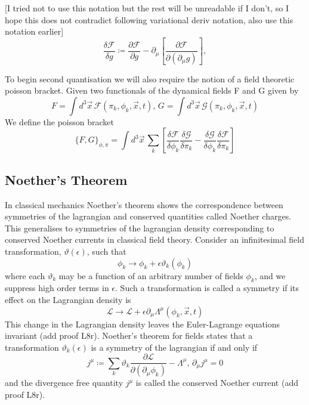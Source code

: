 \documentclass[11pt, a4paper]{article}
\theoremstyle{definition}
\theoremstyle{plain}
\begin{document}
[I tried not to use this notation but the rest will be unreadable if I don't, so I hope this
does not contradict following variational deriv notation, also use this notation earlier]
\begin{equation}
  \frac{\delta \mathcal{F}}{\delta g} \coloneq \frac{\partial \mathcal{F}}{\partial g}
  - \partial_\mu \left[ \frac{\partial \mathcal{F}}{\partial (\partial_\mu g)} \right],
\end{equation}

To begin second quantisation we will also require the notion of a field theoretic poisson bracket.
Given two functionals of the dynamical fields F and G given by 
\begin{equation}
  F = \int{d^3\vec{x}\, \mathcal{F}(\pi_k, \phi_k, \vec{x}, t)},\,
  G = \int{d^3\vec{x}\, \mathcal{G}(\pi_k, \phi_k, \vec{x}, t)}
\end{equation}
We define the poisson bracket
\begin{equation}
  {\{F, G \}}_{\phi,\pi} = \int{d^3\vec{x}\,
  \sum_{k}{\left[ \frac{\delta \mathcal{F}}{\delta \phi_k}\frac{\delta \mathcal{G}}{\delta \pi_k} 
- \frac{\delta \mathcal{G}}{\delta \phi_k}\frac{\delta \mathcal{F}}{\delta \pi_k} \right]}  }
\end{equation}

\subsection{Noether's Theorem}

In classical mechanics Noether's theorem shows the correspondence between symmetries of 
the lagrangian and conserved quantities called Noether charges. This generalises to symmetries
of the lagrangian density corresponding to conserved Noether currents in classical field theory.
Consider an infinitesimal field transformation, $\vartheta(\epsilon)$, such that
\begin{equation}
  \phi_k \rightarrow \phi_k + \epsilon\vartheta_k(\phi_k)
\end{equation}
where each $\vartheta_k$ may be a function of an arbitrary number of fields $\phi_k$, and 
we suppress high order terms in $\epsilon$.
Such a transformation is called a symmetry if its effect on the Lagrangian density is
\begin{equation}
  \mathcal{L} \rightarrow \mathcal{L} + \epsilon\partial_\mu\Lambda^\mu(\phi_k, \vec{x}, t)
\end{equation}
This change in the Lagrangian density leaves the Euler-Lagrange equations invariant (add proof L8r).
Noether's theorem for fields states that a transformation $\vartheta_k(\epsilon)$ is a symmetry
of the lagrangian if and only if 
\begin{equation}
  j^\mu \coloneq
  \sum_{k}{\vartheta_k \frac{\partial \mathcal{L}}{\partial (\partial_\mu \phi_k)}}
  - \Lambda^\mu, \, \partial_\mu j^\mu = 0 
\end{equation}
and the divergence free quantity $j^\mu$ is called the conserved Noether current (add proof L8r).
\end{document}
